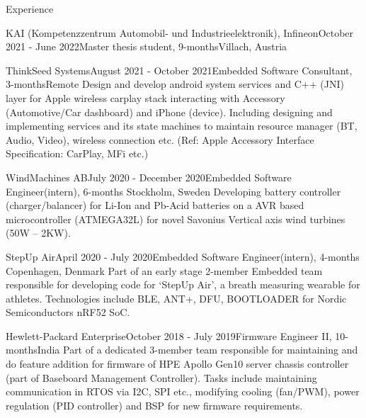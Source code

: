 \documentclass[
	a4paper, %
	11pt, %
]{resume} %
\begin{document}
\begin{rSection}{Experience}
\begin{rSubsection}{KAI (Kompetenzzentrum Automobil- und Industrieelektronik), Infineon}{October 2021 - June 2022}{Master thesis student, 9-months}{Villach, Austria}
	\end{rSubsection}


	\begin{rSubsection}{ThinkSeed Systems}{August 2021 - October 2021}{Embedded Software Consultant, 3-months}{Remote}
            Design and develop android system services and C++ (JNI) layer for Apple wireless carplay stack interacting with Accessory (Automotive/Car dashboard) and iPhone (device). Including designing and implementing services and its state machines to maintain resource manager (BT, Audio, Video), wireless connection etc. (Ref: Apple Accessory Interface Specification: CarPlay, MFi etc.)

		
	\end{rSubsection}


	\begin{rSubsection}{WindMachines AB}{July 2020 - December 2020}{Embedded Software Engineer(intern), 6-months}{ Stockholm, Sweden}
            Developing battery controller (charger/balancer) for Li-Ion and Pb-Acid batteries on a AVR based microcontroller (ATMEGA32L) for novel Savonius Vertical axis wind turbines (50W – 2KW).

	\end{rSubsection}
 

	\begin{rSubsection}{StepUp Air}{April 2020 - July 2020}{Embedded Software Engineer(intern), 4-months}{ Copenhagen, Denmark}
            Part of an early stage 2-member Embedded team responsible for developing code for ‘StepUp Air’, a breath measuring wearable for athletes. Technologies include BLE, ANT+, DFU, BOOTLOADER for Nordic Semiconductors nRF52 SoC.

	\end{rSubsection}
 

	\begin{rSubsection}{Hewlett-Packard Enterprise}{October 2018 - July 2019}{Firmware Engineer II, 10-months}{India}
            Part of a dedicated 3-member team responsible for maintaining and do feature addition for firmware of HPE Apollo Gen10 server chassis controller (part of Baseboard Management Controller). Tasks include maintaining communication in RTOS via I2C, SPI etc., modifying cooling (fan/PWM), power regulation (PID controller) and BSP for new firmware requirements.


\end{rSubsection}
\end{rSection}
\end{document}
